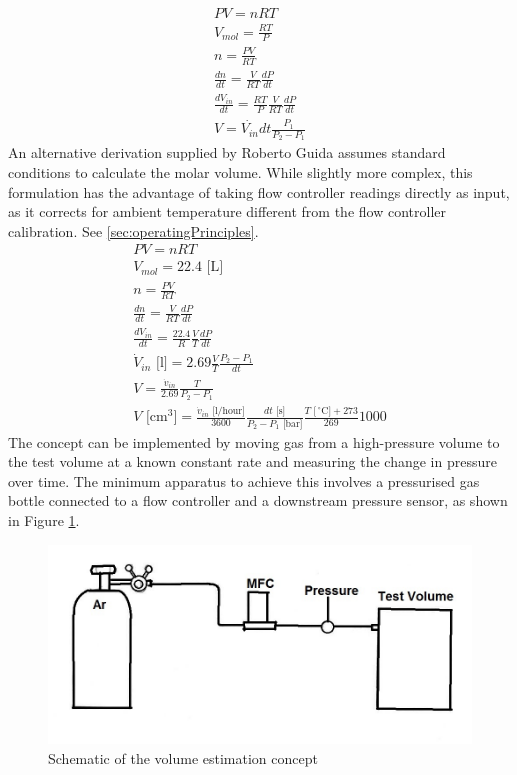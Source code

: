 \documentclass{report}
\begin{document}
\begin{eqnarray}
PV = nRT \label{ideal}\\
V_{mol} = \frac{RT}{P} \label{molarVolume}\\
n = \frac{PV}{RT} \nonumber \\
\frac{dn}{dt} =  \frac {V}{RT} \frac {dP}{dt} \nonumber \\
\frac{dV_{in}}{dt} =  \frac{RT}{P} \frac {V}{RT} \frac {dP}{dt} \nonumber \\
V = \dot{V_{in}} dt \frac{P_1}{P_2 - P_1}
\end{eqnarray}
An alternative derivation supplied by Roberto Guida assumes standard conditions to calculate the molar volume. While slightly more complex, this formulation has the advantage of taking flow controller readings directly as input, as it corrects for ambient temperature different from the flow controller calibration. See \ref{sec:operatingPrinciples}.
\begin{eqnarray}
PV = nRT \nonumber\\
V_{mol} = 22.4 \text{ [L]}\\
n = \frac{PV}{RT} \nonumber \\
\frac{dn}{dt} =  \frac {V}{RT} \frac {dP}{dt} \nonumber \\
\frac{dV_{in}}{dt} =  \frac{22.4}{R} \frac {V}{T} \frac {dP}{dt} \nonumber \\
\dot{V}_{in}\text{ [l]} = 2.69\frac{V}{T} \frac{P_2 - P_1}{dt} \nonumber \\
V = \frac{\dot{v}_{in}}{2.69} \frac{T}{P_2 - P_1}\nonumber \\
V\text{ [cm$^3$]} = \frac{\dot{v}_{in}\text{ [l/hour]}}{3600}\frac{dt\text{ [s]}}{P_2-P_1 \text{ [bar]}}\frac{T\text{ [$\,^{\circ}\mathrm{C}$]}+273}{269}1000 \label{roberto}
\end{eqnarray}
The concept can be implemented by moving gas from a high-pressure volume to the test volume at a known constant rate and measuring the change in pressure over time. The minimum apparatus to achieve this involves a pressurised gas bottle connected to a flow controller and a downstream pressure sensor, as shown in Figure \ref{schematic}.
\begin{figure}[h]
\includegraphics[width=\textwidth]{schematic}
\caption{Schematic of the volume estimation concept}
\label{schematic}
\end{figure}
\\
\end{document}
